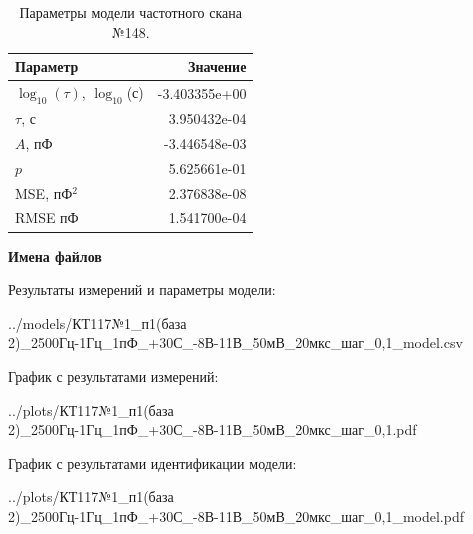 \begin{table}[!ht]
    \centering
    \caption{Параметры модели частотного скана №148.}
    \begin{tabular}{|l|r|}
        \hline
        Параметр                                       & Значение                  \\ \hline
        $\log_{10}(\tau)$, $\log_{10}$(с)              & -3.403355e+00             \\ \hline
        $\tau$, с                                      & 3.950432e-04              \\ \hline
        $A$, пФ                                        & -3.446548e-03             \\ \hline
        $p$                                            & 5.625661e-01              \\ \hline
        MSE, пФ$^2$                                    & 2.376838e-08              \\ \hline
        RMSE пФ                                        & 1.541700e-04              \\ \hline
    \end{tabular}
    \label{table:frequency_scan_model_148}
\end{table}

\textbf{Имена файлов}

Результаты измерений и параметры модели:

\scriptsize../models/КТ117№1\_п1(база 2)\_2500Гц-1Гц\_1пФ\_+30С\_-8В-11В\_50мВ\_20мкс\_шаг\_0,1\_model.csv
\normalsize

График с результатами измерений:

\scriptsize../plots/КТ117№1\_п1(база 2)\_2500Гц-1Гц\_1пФ\_+30С\_-8В-11В\_50мВ\_20мкс\_шаг\_0,1.pdf
\normalsize

График с результатами идентификации модели:

\scriptsize../plots/КТ117№1\_п1(база 2)\_2500Гц-1Гц\_1пФ\_+30С\_-8В-11В\_50мВ\_20мкс\_шаг\_0,1\_model.pdf
\normalsize

